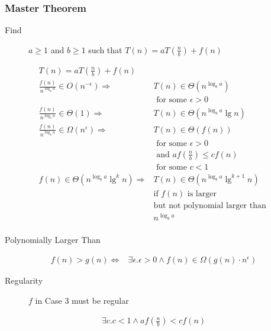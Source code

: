 \documentclass[10pt, a4paper,landscape]{article}
\begin{document}
\begin{multicols*}{4}
\subsubsection{Master Theorem}
\begin{description}
    \item[Find] $a \geq 1$ and $b \geq 1$ such that $T(n) = a T\left(\frac n b\right) + f(n)$
\end{description}
\begin{align*}
    T(n) = a T\left(\frac n b\right) + f(n) \\
    \frac{f(n)}{n^{\log_b a}} \in O(n^{-\epsilon})  \Rightarrow& T(n) \in \Theta(n^{\log_b a})\\ &\text{ for some } \epsilon > 0 \\
    \frac{f(n)}{n^{\log_b a}} \in \Theta(1) \Rightarrow& T(n) \in \Theta(n^{\log_b a} \lg n) \\
    \frac{f(n)}{n^{\log_b a}} \in \Omega(n^{\epsilon}) \Rightarrow& T(n) \in \Theta(f(n))\\ &\text{ for some } \epsilon > 0 \\&\text{ and } af(\frac{n}{b}) \leq cf(n)\\ &\text{ for some } c < 1 \\
    f(n) \in \Theta(n^{\log_b a} \lg^{k} n) \Rightarrow& T(n) \in \Theta(n^{\log_b a} \lg^{k + 1} n)\\ &\text{if } f(n) \text{ is larger}\\ &\text{but not polynomial larger than }\\ &n^{\log_b a}\\
\end{align*}

\begin{description}
    \item[Polynomially Larger Than]
\end{description}
\begin{align*}
    f(n) > g(n) \Leftrightarrow& \exists \epsilon. \epsilon > 0 \land f(n) \in \Omega(g(n) \cdot n^\epsilon)
\end{align*}

\begin{description}
    \item[Regularity] $f$ in Case 3 must be regular
\end{description}
\begin{align*}
    \exists c. c < 1 \land af\left(\frac n b\right) < cf(n)\\
\end{align*}


\end{multicols*}
\end{document}
